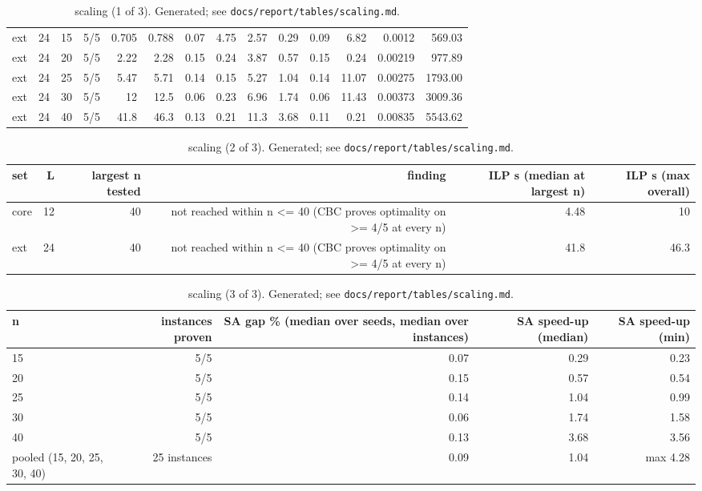 \begin{table}[t]
\begin{tabular}{lrrrrrrrrrrrrr}
ext & 24 & 15 & 5/5 & 0.705 & 0.788 & 0.07 & 4.75 & 2.57 & 0.29 & 0.09 & 6.82 & 0.0012 & 569.03 \\
ext & 24 & 20 & 5/5 & 2.22 & 2.28 & 0.15 & 0.24 & 3.87 & 0.57 & 0.15 & 0.24 & 0.00219 & 977.89 \\
ext & 24 & 25 & 5/5 & 5.47 & 5.71 & 0.14 & 0.15 & 5.27 & 1.04 & 0.14 & 11.07 & 0.00275 & 1793.00 \\
ext & 24 & 30 & 5/5 & 12 & 12.5 & 0.06 & 0.23 & 6.96 & 1.74 & 0.06 & 11.43 & 0.00373 & 3009.36 \\
ext & 24 & 40 & 5/5 & 41.8 & 46.3 & 0.13 & 0.21 & 11.3 & 3.68 & 0.11 & 0.21 & 0.00835 & 5543.62 \\
\bottomrule
\end{tabular}
\caption{scaling (1 of 3). Generated; see \texttt{docs/report/tables/scaling.md}.}
\label{tab:scaling-1}
\end{table}

\begin{table}[t]
\centering
\small
\begin{tabular}{lrrrrr}
\toprule
set & L & largest n tested & finding & ILP s (median at largest n) & ILP s (max overall) \\
\midrule
core & 12 & 40 & not reached within n <= 40 (CBC proves optimality on >= 4/5 at every n) & 4.48 & 10 \\
ext & 24 & 40 & not reached within n <= 40 (CBC proves optimality on >= 4/5 at every n) & 41.8 & 46.3 \\
\bottomrule
\end{tabular}
\caption{scaling (2 of 3). Generated; see \texttt{docs/report/tables/scaling.md}.}
\label{tab:scaling-2}
\end{table}

\begin{table}[t]
\centering
\small
\begin{tabular}{lrrrr}
\toprule
n & instances proven & SA gap \% (median over seeds, median over instances) & SA speed-up (median) & SA speed-up (min) \\
\midrule
15 & 5/5 & 0.07 & 0.29 & 0.23 \\
20 & 5/5 & 0.15 & 0.57 & 0.54 \\
25 & 5/5 & 0.14 & 1.04 & 0.99 \\
30 & 5/5 & 0.06 & 1.74 & 1.58 \\
40 & 5/5 & 0.13 & 3.68 & 3.56 \\
pooled (15, 20, 25, 30, 40) & 25 instances & 0.09 & 1.04 & max 4.28 \\
\bottomrule
\end{tabular}
\caption{scaling (3 of 3). Generated; see \texttt{docs/report/tables/scaling.md}.}
\label{tab:scaling-3}
\end{table}

